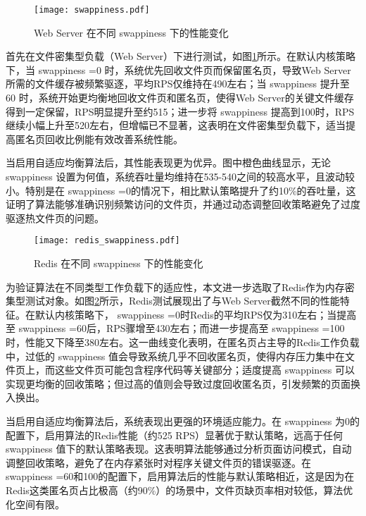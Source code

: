 \begin{figure}[htbp]
    \centering
    \texttt{[image: swappiness.pdf]}
    \caption{Web Server 在不同  swappiness  下的性能变化}
    \label{fig:web_server_swappiness}
\end{figure}

首先在文件密集型负载（Web Server）下进行测试，如图\ref{fig:web_server_swappiness}所示。在默认内核策略下，当  swappiness =0 时，系统优先回收文件页而保留匿名页，导致Web Server所需的文件缓存被频繁驱逐，平均RPS仅维持在490左右；当  swappiness  提升至 60 时，系统开始更均衡地回收文件页和匿名页，使得Web Server的关键文件缓存得到一定保留，RPS明显提升至约515；进一步将 swappiness 提高到100时，RPS继续小幅上升至520左右，但增幅已不显著，这表明在文件密集型负载下，适当提高匿名页回收比例能有效改善系统性能。

当启用自适应均衡算法后，其性能表现更为优异。图中橙色曲线显示，无论 swappiness 设置为何值，系统吞吐量均维持在535-540之间的较高水平，且波动较小。特别是在 swappiness =0的情况下，相比默认策略提升了约10\%的吞吐量，这证明了算法能够准确识别频繁访问的文件页，并通过动态调整回收策略避免了过度驱逐热文件页的问题。

\begin{figure}[htbp]
    \centering
    \texttt{[image: redis\_swappiness.pdf]}
    \caption{Redis 在不同  swappiness  下的性能变化}
    \label{fig:redis_swappiness}
\end{figure}

为验证算法在不同类型工作负载下的适应性，本文进一步选取了Redis作为内存密集型测试对象。如图\ref{fig:redis_swappiness}所示，Redis测试展现出了与Web Server截然不同的性能特征。在默认内核策略下， swappiness =0时Redis的平均RPS仅为310左右；当提高至 swappiness =60后，RPS骤增至430左右；而进一步提高至 swappiness =100时，性能又下降至380左右。这一曲线变化表明，在匿名页占主导的Redis工作负载中，过低的 swappiness 值会导致系统几乎不回收匿名页，使得内存压力集中在文件页上，而这些文件页可能包含程序代码等关键部分；适度提高 swappiness 可以实现更均衡的回收策略；但过高的值则会导致过度回收匿名页，引发频繁的页面换入换出。

当启用自适应均衡算法后，系统表现出更强的环境适应能力。在 swappiness 为0的配置下，启用算法的Redis性能（约525 RPS）显著优于默认策略，远高于任何 swappiness 值下的默认策略表现。这表明算法能够通过分析页面访问模式，自动调整回收策略，避免了在内存紧张时对程序关键文件页的错误驱逐。在 swappiness =60和100的配置下，启用算法后的性能与默认策略相近，这是因为在Redis这类匿名页占比极高（约90\%）的场景中，文件页缺页率相对较低，算法优化空间有限。

